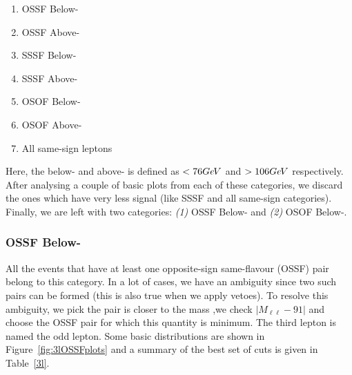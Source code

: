 \documentclass[letterpaper,12pt]{article}
\newcommand{\GeV}{{Ge\kern -0.1em V}}
\begin{document}
\begin{enumerate}
\item OSSF Below-\Zboson
\item OSSF Above-\Zboson
\item SSSF Below-\Zboson
\item SSSF Above-\Zboson
\item OSOF Below-\Zboson
\item OSOF Above-\Zboson
\item All same-sign leptons
\end{enumerate}

Here, the below-\Zboson{} and above-\Zboson{} is defined as $<76\GeV$ and $>106\GeV$ respectively. After analysing a couple of basic plots from each of these categories, we discard the ones which have very less signal (like SSSF and all same-sign categories). Finally, we are left with two categories: \emph{(1)} OSSF Below-\Zboson{} and \emph{(2)} OSOF Below-\Zboson.

\subsubsection{OSSF Below-{\boldmath \Zboson}}
\label{sec:ossf}

All the events that have at least one opposite-sign same-flavour (OSSF) pair belong to this category. In a lot of cases, we have an ambiguity since two such pairs can be formed (this is also true when we apply vetoes). To resolve this ambiguity, we pick the pair is closer to the \Zboson{} mass ,\ie we check $|M_{\ell\ell} - 91|$ and choose the OSSF pair for which this quantity is minimum. The third lepton is named the odd lepton. Some basic distributions are shown in Figure~\ref{fig:3lOSSFplots} and a summary of the best set of cuts is given in Table~\ref{3l}.
\end{document}
